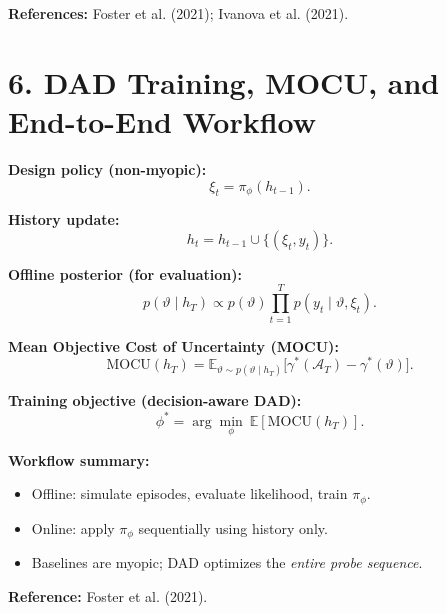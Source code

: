 \textbf{References:}
Foster et al. (2021); Ivanova et al. (2021).

\newpage
\section*{6. DAD Training, MOCU, and End-to-End Workflow}

\textbf{Design policy (non-myopic):}
\[
\xi_t=\pi_\phi(h_{t-1}).
\]

\textbf{History update:}
\[
h_t=h_{t-1}\cup\{(\xi_t,y_t)\}.
\]

\textbf{Offline posterior (for evaluation):}
\[
p(\vartheta\mid h_T)\propto
p(\vartheta)\prod_{t=1}^T p(y_t\mid \vartheta,\xi_t).
\]

\textbf{Mean Objective Cost of Uncertainty (MOCU):}
\[
\mathrm{MOCU}(h_T)=
\mathbb{E}_{\vartheta\sim p(\vartheta\mid h_T)}
\big[\gamma^*(\mathcal{A}_T)-\gamma^*(\vartheta)\big].
\]

\textbf{Training objective (decision-aware DAD):}
\[
\phi^*=\arg\min_\phi\ \mathbb{E}[\mathrm{MOCU}(h_T)].
\]

\textbf{Workflow summary:}
\begin{itemize}
\item Offline: simulate episodes, evaluate likelihood, train $\pi_\phi$.
\item Online: apply $\pi_\phi$ sequentially using history only.
\item Baselines are myopic; DAD optimizes the \emph{entire probe sequence}.
\end{itemize}

\textbf{Reference:}
Foster et al. (2021).

